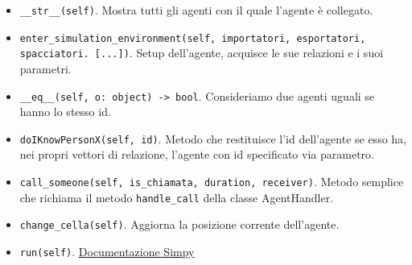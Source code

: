 \documentclass{article}
\begin{document}
\begin{itemize}
    \item \texttt{__str__(self)}. Mostra tutti gli agenti con il quale l'agente è collegato.
    
   \item \texttt{enter_simulation_environment(self, importatori, esportatori, spacciatori. [...])}. Setup dell'agente, acquisce le sue relazioni e i suoi parametri.
   
    \item \texttt{__eq__(self, o: object) -> bool}. Consideriamo due agenti uguali se hanno lo stesso id.
    
    \item \texttt{doIKnowPersonX(self, id)}. Metodo che restituisce l'id dell'agente se esso ha, nei propri vettori di relazione, l'agente con id specificato via parametro.
    
    \item \texttt{call_someone(self, is_chiamata, duration, receiver)}. Metodo semplice che richiama il metodo \texttt{handle_call} della classe AgentHandler.
    
    \item \texttt{change_cella(self)}. Aggiorna la posizione corrente dell'agente.
    
    \item \texttt{run(self)}. \href{https://simpy.readthedocs.io/en/latest/simpy_intro/process_interaction.html}{Documentazione Simpy}
   
\end{itemize}
  
\end{document}
